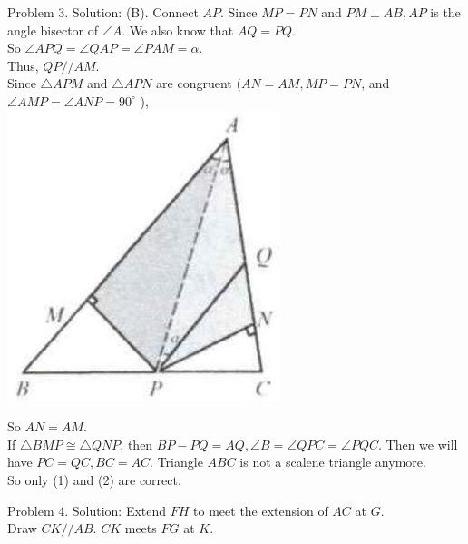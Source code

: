 \documentclass[10pt]{article}
\begin{document}
Problem 3. Solution: (B).
Connect \(A P\). Since \(M P=P N\) and \(P M \perp A B, A P\) is the angle bisector of \(\angle A\). We also know that \(A Q=P Q\).\\
So \(\angle A P Q=\angle Q A P=\angle P A M=\alpha\).\\
Thus, \(Q P / / A M\).\\
Since \(\triangle A P M\) and \(\triangle A P N\) are congruent \((A N=A M, M P=P N\), and \(\angle A M P=\angle A N P=90^{\circ}\) ),\\
\includegraphics[max width=\textwidth, center]{2025_04_17_97bc1f7e44d93c271a88g-067(1)}


So \(A N=A M\).\\
If \(\triangle B M P \cong \triangle Q N P\), then \(B P-P Q=A Q, \angle B=\angle Q P C=\angle P Q C\). Then we will have \(P C=Q C, B C=A C\). Triangle \(A B C\) is not a scalene triangle anymore.\\
So only (1) and (2) are correct.

Problem 4. Solution:
Extend \(F H\) to meet the extension of \(A C\) at \(G\).\\
Draw \(C K / / A B\). \(C K\) meets \(F G\) at \(K\).
\end{document}
